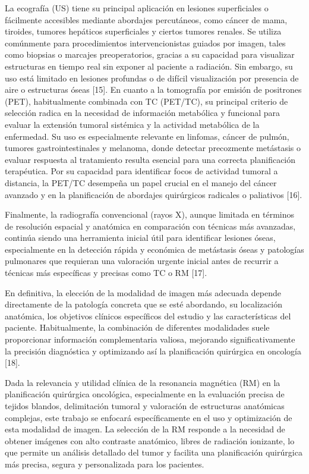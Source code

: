 La ecografía (US) tiene su principal aplicación en lesiones superficiales o fácilmente accesibles mediante abordajes percutáneos, como cáncer de mama, tiroides, tumores hepáticos superficiales y ciertos tumores renales. Se utiliza comúnmente para procedimientos intervencionistas guiados por imagen, tales como biopsias o marcajes preoperatorios, gracias a su capacidad para visualizar estructuras en tiempo real sin exponer al paciente a radiación. Sin embargo, su uso está limitado en lesiones profundas o de difícil visualización por presencia de aire o estructuras óseas [15]. En cuanto a la tomografía por emisión de positrones (PET), habitualmente combinada con TC (PET/TC), su principal criterio de selección radica en la necesidad de información metabólica y funcional para evaluar la extensión tumoral sistémica y la actividad metabólica de la enfermedad. Su uso es especialmente relevante en linfomas, cáncer de pulmón, tumores gastrointestinales y melanoma, donde detectar precozmente metástasis o evaluar respuesta al tratamiento resulta esencial para una correcta planificación terapéutica. Por su capacidad para identificar focos de actividad tumoral a distancia, la PET/TC desempeña un papel crucial en el manejo del cáncer avanzado y en la planificación de abordajes quirúrgicos radicales o paliativos [16]. 

Finalmente, la radiografía convencional (rayos X), aunque limitada en términos de resolución espacial y anatómica en comparación con técnicas más avanzadas, continúa siendo una herramienta inicial útil para identificar lesiones óseas, especialmente en la detección rápida y económica de metástasis óseas y patologías pulmonares que requieran una valoración urgente inicial antes de recurrir a técnicas más específicas y precisas como TC o RM [17]. 

En definitiva, la elección de la modalidad de imagen más adecuada depende directamente de la patología concreta que se esté abordando, su localización anatómica, los objetivos clínicos específicos del estudio y las características del paciente. Habitualmente, la combinación de diferentes modalidades suele proporcionar información complementaria valiosa, mejorando significativamente la precisión diagnóstica y optimizando así la planificación quirúrgica en oncología [18]. 

Dada la relevancia y utilidad clínica de la resonancia magnética (RM) en la planificación quirúrgica oncológica, especialmente en la evaluación precisa de tejidos blandos, delimitación tumoral y valoración de estructuras anatómicas complejas, este trabajo se enfocará específicamente en el uso y optimización de esta modalidad de imagen. La selección de la RM responde a la necesidad de obtener imágenes con alto contraste anatómico, libres de radiación ionizante, lo que permite un análisis detallado del tumor y facilita una planificación quirúrgica más precisa, segura y personalizada para los pacientes. 

